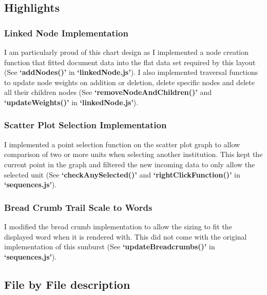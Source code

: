 \documentclass[a4paper, 11pt]{article}
\begin{document}
\subsection{Highlights} 
\subsubsection{Linked Node Implementation}
I am particularly proud of this chart design as I implemented a node creation function that fitted document data into the flat data set required by this layout (See \textbf{`addNodes()'} in \textbf{`linkedNode.js'}). I also implemented traversal functions to update node weights on addition or deletion, delete specific nodes and delete all their children nodes (See \textbf{`removeNodeAndChildren()'} and \textbf{`updateWeights()'} in \textbf{`linkedNode.js'}).

\subsubsection{Scatter Plot Selection Implementation}
I implemented a point selection function on the scatter plot graph to allow comparison of two or more units when selecting another institution. This kept the current point in the graph and filtered the new incoming data to only allow the selected unit (See \textbf{`checkAnySelected()'} and \textbf{`rightClickFunction()'} in \textbf{`sequences.js'}).

\subsubsection{Bread Crumb Trail Scale to Words}
I modified the bread crumb implementation to allow the sizing to fit the displayed word when it is rendered with. This did not come with the original implementation of this sunburst (See \textbf{`updateBreadcrumbs()'} in \textbf{`sequences.js'}).

\subsection{File by File description}
\end{document}
